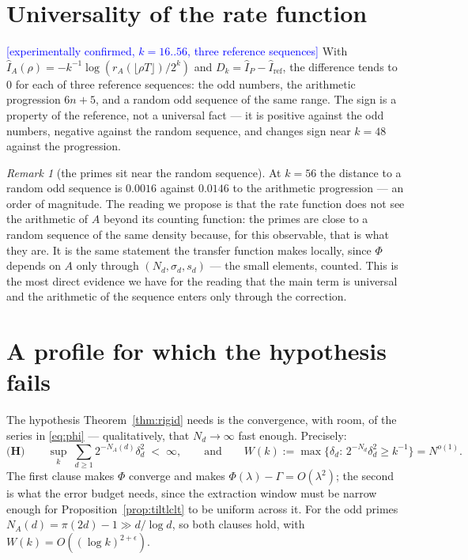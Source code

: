 \documentclass[11pt,a4paper]{article}
\theoremstyle{plain}
\theoremstyle{definition}
\theoremstyle{remark}
\newtheorem{remark}[theorem]{Remark}
\newcommand{\STATUS}[1]{\textcolor{blue}{\textsf{[#1]}}}
\begin{document}
\section{Universality of the rate function}\label{sec:universality}

\STATUS{experimentally confirmed, $k=16..56$, three reference sequences}
With $\hat I_A(\rho)=-k^{-1}\log(r_A(\lfloor\rho T\rfloor)/2^k)$ and
$D_k=\hat I_P-\hat I_{\mathrm{ref}}$, the difference tends to $0$ for each of three reference
sequences: the odd numbers, the arithmetic progression $6n+5$, and a random odd sequence of the
same range. The sign is a property of the reference, not a universal fact --- it is positive
against the odd numbers, negative against the random sequence, and changes sign near $k=48$
against the progression.

\begin{remark}[the primes sit near the random sequence]\label{rem:random}
At $k=56$ the distance to a random odd sequence is $0.0016$ against $0.0146$ to the arithmetic
progression --- an order of magnitude. The reading we propose is that the rate function does
not see the arithmetic of $A$ beyond its counting function: the primes are close to a random
sequence of the same density because, for this observable, that is what they are. It is the
same statement the transfer function makes locally, since $\Phi$ depends on $A$ only through
$(N_d,\sigma_d,s_d)$ --- the small elements, counted. This is the most direct evidence we have
for the reading that the main term is universal and the arithmetic of the sequence enters only
through the correction.
\end{remark}

\section{A profile for which the hypothesis fails}\label{sec:counterexample}

The hypothesis Theorem~\ref{thm:rigid} needs is the convergence, with room, of the series in
\eqref{eq:phi} --- qualitatively, that $N_d\to\infty$ fast enough. Precisely:
\[
  \textbf{(H)}\qquad
  \sup_k\;\sum_{d\ge1}2^{-N_A(d)}\delta_d^{2}\;<\;\infty,
  \qquad\text{and}\qquad
  W(k):=\max\{\delta_d:\,2^{-N_d}\delta_d^{2}\ge k^{-1}\}=N^{o(1)} .
\]
The first clause makes $\Phi$ converge and makes $\Phi(\lambda)-\Gamma=O(\lambda^{2})$; the
second is what the error budget needs, since the extraction window must be narrow enough for
Proposition~\ref{prop:tiltlclt} to be uniform across it. For the odd primes
$N_A(d)=\pi(2d)-1\gg d/\log d$, so both clauses hold, with $W(k)=O((\log k)^{2+\epsilon})$.
\end{document}
